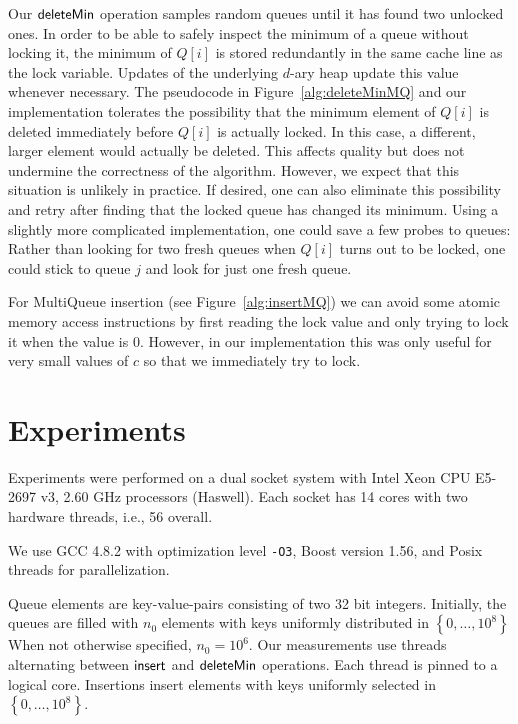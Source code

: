 \documentclass[a4paper,12pt]{article}
\newcommand{\Id}[1]{\ensuremath{\text{{\sf #1}}}}
\newcommand{\set}[1]{\left\{ #1\right\}}
\begin{document}
Our \Id{deleteMin} operation samples random queues until it has found two unlocked ones. In order to be able to safely inspect the minimum of a queue without locking it, the minimum of $Q[i]$ is stored redundantly in the same cache line as the lock variable. Updates of the underlying $d$-ary heap update this value whenever necessary. The pseudocode in Figure~\ref{alg:deleteMinMQ} and our implementation tolerates the possibility that the minimum element of $Q[i]$ is deleted immediately before $Q[i]$ is actually locked. In this case, a different, larger element would actually be deleted. This affects quality but does not undermine the correctness of the algorithm. However, we expect that this situation is unlikely in practice. If desired, one can also eliminate this possibility and retry after finding that the locked queue has changed its minimum.  Using a slightly more complicated implementation, one could save a few probes to queues: Rather than looking for two fresh queues when $Q[i]$ turns out to be locked, one could stick to queue $j$ and look for just one fresh queue.

For MultiQueue insertion (see Figure~\ref{alg:insertMQ}) we can avoid some atomic memory access instructions by first reading the lock value and only trying to lock it when the value is 0. However, in our implementation this was only useful for very small values of $c$ so that we immediately try to lock.


\section{Experiments}
\label{s:experiments}

Experiments were performed on a dual socket system with Intel\textsuperscript{\textregistered} Xeon\textsuperscript{\textregistered} CPU E5-2697 v3, 2.60 GHz processors (Haswell). Each socket has 14 cores with two hardware threads, i.e., 56 overall.

We use GCC 4.8.2 with optimization level {\tt -O3}, Boost version 1.56, and Posix threads for parallelization. 

Queue elements are key-value-pairs consisting of two 32 bit integers. 
Initially, the queues are filled with $n_0$ elements with keys uniformly distributed in $\set{0,\ldots,10^8}$ When not otherwise specified, $n_0=10^6$.
Our measurements use threads alternating between \Id{insert} and \Id{deleteMin} operations. Each thread is pinned to a logical core.
Insertions insert elements with keys uniformly selected in $\set{0,\ldots,10^8}$.
\end{document}
